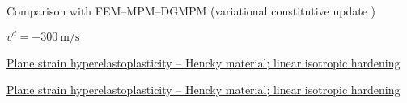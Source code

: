 
%       


\begin{frame}
  \footnotesize Comparison with FEM--MPM--DGMPM (variational constitutive update \cite{LaurentVariational})
  \centering
  
  \footnotesize $v^d = -300 \: \text{m/s}$
  
\end{frame}

\begin{frame}{\href{section4/animation/hyperelastoplasticity/stress.mp4}{Plane strain hyperelastoplasticity -- Hencky material; linear isotropic hardening}}
  \begin{center}
  \end{center}
\end{frame}


\begin{frame}{\href{section4/animation/hyperelastoplasticity/epeq.mp4}{Plane strain hyperelastoplasticity -- Hencky material; linear isotropic hardening}}
  \begin{center}
  \end{center}
\end{frame}



